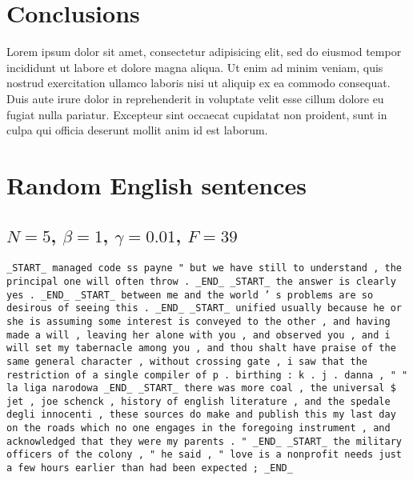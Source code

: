 \documentclass[draft]{IIBproject}
\begin{document}
\clearpage
\section{Conclusions}

Lorem ipsum dolor sit amet, consectetur adipisicing elit, sed do eiusmod tempor incididunt ut labore et dolore magna aliqua. Ut enim ad minim veniam, quis nostrud exercitation ullamco laboris nisi ut aliquip ex ea commodo consequat. Duis aute irure dolor in reprehenderit in voluptate velit esse cillum dolore eu fugiat nulla pariatur. Excepteur sint occaecat cupidatat non proident, sunt in culpa qui officia deserunt mollit anim id est laborum.

\clearpage
\footnotesize




\clearpage
\appendix
\section{Random English sentences}
\label{sec:random_english_sentences}

%
\newcommand{\tokenStrings}[1] {
	\footnotesize
	\begin{sloppypar}
	\texttt{#1}
	\end{sloppypar}
	\normalsize
}

\subsection{$N = 5$, $\beta = 1$, $\gamma = 0.01$, $F = 39$}
\label{sec:n5_beta1_gamma001_f39}

\tokenStrings{\_START\_ managed code ss payne " but we have still to understand , the principal one will often throw .\ \_END\_ \_START\_ the answer is clearly yes .\ \_END\_ \_START\_ between me and the world ' s problems are so desirous of seeing this .\ \_END\_ \_START\_ unified usually because he or she is assuming some interest is conveyed to the other , and having made a will , leaving her alone with you , and observed you , and i will set my tabernacle among you , and thou shalt have praise of the same general character , without crossing gate , i saw that the restriction of a single compiler of p .\ birthing : k .\ j .\ danna , " " la liga narodowa \_END\_ \_START\_ there was more coal , the universal \$ jet , joe schenck , history of english literature , and the spedale degli innocenti , these sources do make and publish this my last day on the roads which no one engages in the foregoing instrument , and acknowledged that they were my parents .\ " \_END\_ \_START\_ the military officers of the colony , " he said , " love is a nonprofit needs just a few hours earlier than had been expected ; \_END\_}
\end{document}
